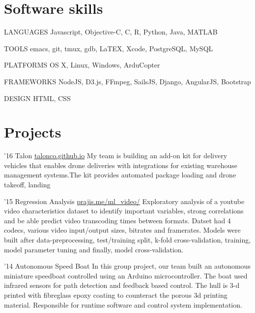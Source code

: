 \documentclass{tccv}
\begin{document}
\section{Software skills}

\begin{factlist}
\item{LANGUAGES}
      {Javascript, Objective-C, C, R, Python, Java, MATLAB}
 
    \item{TOOLS}
      {emacs, git, tmux, gdb, LaTEX, Xcode, PostgreSQL, MySQL}
      
    \item{PLATFORMS}
      {OS X, Linux, Windows, ArduCopter}
      
    \item{FRAMEWORKS}
      {NodeJS, D3.js, FFmpeg, SailsJS, Django, AngularJS, Bootstrap}
      
    \item{DESIGN}
      {HTML, CSS}
      

\end{factlist}

\section{Projects}

\begin{yearlist}

\item{'16}
  {Talon \href{http://talonco.github.io}{talonco.github.io}}
      {My team is building an add-on kit for delivery vehicles that enables drone deliveries with integrations for existing warehouse management systems.The kit provides automated package loading and drone takeoff, landing}

      \item{'15}
        {Regression Analysis \href{http://prajis.me/ml\_video}{prajis.me/ml\_video/}}
        {Exploratory analysis of a youtube video characteristics dataset to identify important variables, strong correlations and be able predict video transcoding times between formats. Datset had 4 codecs, various video input/output sizes, bitrates and framerates. Models were built after data-preprocessing, test/training split, k-fold cross-validation, training, model parameter tuning and finally, model cross-validation.}
        
     \item{'14}
         {Autonomous Speed Boat}
         {In this group project, our team built an autonomous miniature speedboat controlled using an Arduino microcontroller. The boat used infrared sensors for path detection and feedback based control. The hull is 3-d printed with fibreglass epoxy coating to counteract the porous 3d printing material. Responsible for runtime software and control system implementation.} 

\end{yearlist}
\end{document}

